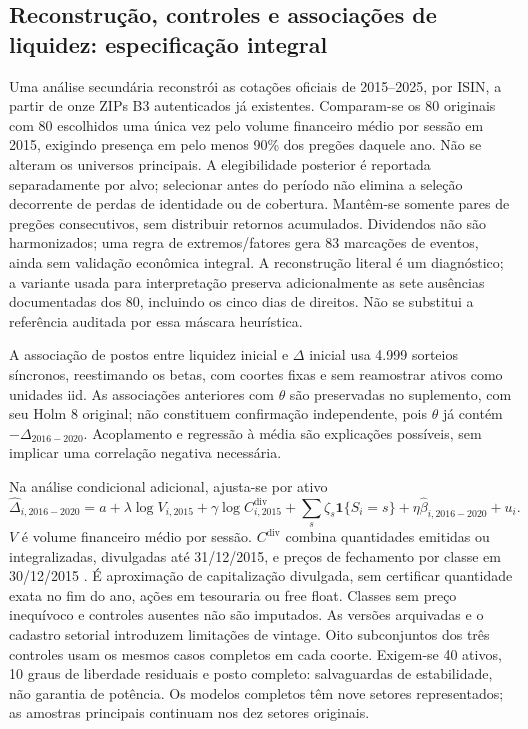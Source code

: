 \documentclass[12 pt]{article}
\begin{document}
\subsection{Reconstrução, controles e associações de liquidez: especificação integral}
Uma análise secundária reconstrói as cotações oficiais de 2015--2025,
por ISIN, a partir de onze ZIPs B3 autenticados já existentes.
Comparam-se os 80 originais com 80 escolhidos uma única vez pelo volume
financeiro médio por sessão em 2015, exigindo presença em pelo menos
90\% dos pregões daquele ano. Não se alteram os universos principais.
A elegibilidade posterior é reportada separadamente por alvo; selecionar
antes do período não elimina a seleção decorrente de perdas de identidade
ou de cobertura. Mantêm-se somente pares de pregões consecutivos,
sem distribuir retornos acumulados. Dividendos não são harmonizados;
uma regra de extremos/fatores gera 83 marcações de eventos, ainda
sem validação econômica integral. A reconstrução literal é um diagnóstico;
a variante usada para interpretação preserva adicionalmente as sete
ausências documentadas dos 80, incluindo os cinco dias de direitos.
Não se substitui a referência auditada por essa máscara heurística.

A associação de postos entre liquidez inicial e $\Delta$ inicial usa
4.999 sorteios síncronos, reestimando os betas, com coortes fixas e
sem reamostrar ativos como unidades iid. As associações anteriores
com $\theta$ são preservadas no suplemento, com seu Holm 8 original;
não constituem confirmação independente, pois $\theta$ já contém
$-\Delta_{2016-2020}$. Acoplamento e regressão à média são explicações
possíveis, sem implicar uma correlação negativa necessária.

Na análise condicional adicional, ajusta-se por ativo
\begin{equation}
 \widehat\Delta_{i, 2016-2020}=a+\lambda\log V_{i, 2015}
 +\gamma\log C_{i, 2015}^{\mathrm{div}}
 +\sum_s\zeta_s\mathbf1\{S_i=s\}+\eta\widehat\beta_{i, 2016-2020}+u_i.
\end{equation}
$V$ é volume financeiro médio por sessão. $C^{\mathrm{div}}$ combina
quantidades emitidas ou integralizadas, divulgadas até 31/12/2015,
e preços de fechamento por classe em 30/12/2015 \cite{cvmfre}.
É aproximação de capitalização divulgada, sem certificar quantidade
exata no fim do ano, ações em tesouraria ou free float. Classes sem
preço inequívoco e controles ausentes não são imputados. As versões
arquivadas e o cadastro setorial introduzem limitações de vintage.
Oito subconjuntos dos três controles usam os mesmos casos completos
em cada coorte. Exigem-se 40 ativos, 10 graus de liberdade residuais
e posto completo: salvaguardas de estabilidade, não garantia de potência.
Os modelos completos têm nove setores representados; as amostras
principais continuam nos dez setores originais.
\end{document}
